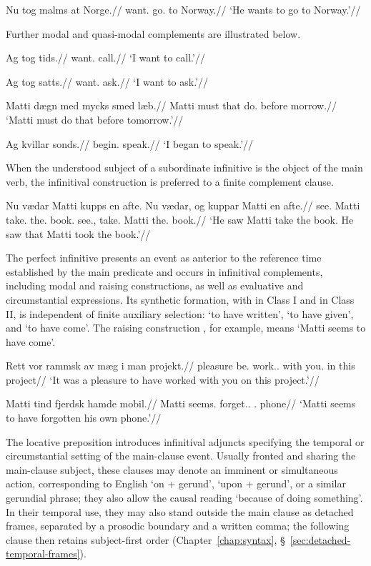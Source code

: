 \pex
\begingl
\gla Nu tog malms at Norge.//
\glb \Third{}\Sg{} want.\Pres{} go.\Inf{} to Norway.//
\glft `He wants to go to Norway.'//
\endgl
\xe

Further modal and quasi-modal complements are illustrated below.

\pex
\begingl
\gla Ag tog tids.//
\glb \First{}\Sg{} want.\Pres{} call.\Inf{}//
\glft `I want to call.'//
\endgl
\xe

\pex
\begingl
\gla Ag tog satts.//
\glb \First{}\Sg{} want.\Pres{} ask.\Inf{}//
\glft `I want to ask.'//
\endgl
\xe

\pex
\begingl
\gla Matti dægn med mycks smed læb.//
\glb Matti must that do.\Inf{} before morrow.//
\glft `Matti must do that before tomorrow.'//
\endgl
\xe

\pex
\begingl
\gla Ag kvillar sonds.//
\glb \First{}\Sg{} begin.\Pst{} speak.\Inf{}//
\glft `I began to speak.'//
\endgl
\xe

When the understood subject of a subordinate infinitive is the object of the main verb, the infinitival construction is preferred to a finite complement clause.

\pex
\begingl
\gla Nu vædar Matti kupps en afte. Nu vædar, og kuppar Matti en afte.//
\glb \Third{}\Sg{} see.\Pst{} Matti take.\Inf{} the.\M{} book. \Third{}\Sg{} see.\Pst{}, \Cmpl{} take.\Pst{} Matti the.\M{} book.//
\glft `He saw Matti take the book. He saw that Matti took the book.'//
\endgl
\xe

The perfect infinitive presents an event as anterior to the reference time established by the main predicate and occurs in infinitival complements, including modal and raising constructions, as well as evaluative and circumstantial expressions. Its synthetic formation, with  in Class I and  in Class II, is independent of finite auxiliary selection:  `to have written',  `to have given', and  `to have come'. The raising construction , for example, means `Matti seems to have come'.

\pex
\begingl
\gla Rett vor rammsk av mæg i man projekt.//
\glb pleasure be.\Pst{} work.\Perf.\Inf{} with you.\Acc{} in this project//
\glft `It was a pleasure to have worked with you on this project.'//
\endgl
\xe

\pex
\begingl
\gla Matti tind fjerdsk hamde mobil.//
\glb Matti seems.\Pres{} forget.\Perf.\Inf{} \Refl{}.\M{} phone//
\glft `Matti seems to have forgotten his own phone.'//
\endgl
\xe

The locative preposition  introduces infinitival adjuncts specifying the temporal or circumstantial setting of the main-clause event. Usually fronted and sharing the main-clause subject, these clauses may denote an imminent or simultaneous action, corresponding to English `on + gerund', `upon + gerund', or a similar gerundial phrase; they also allow the causal reading `because of doing something'. In their temporal use, they may also stand outside the main clause as detached frames, separated by a prosodic boundary and a written comma; the following clause then retains subject-first order (Chapter~\ref{chap:syntax}, \S~\ref{sec:detached-temporal-frames}).

